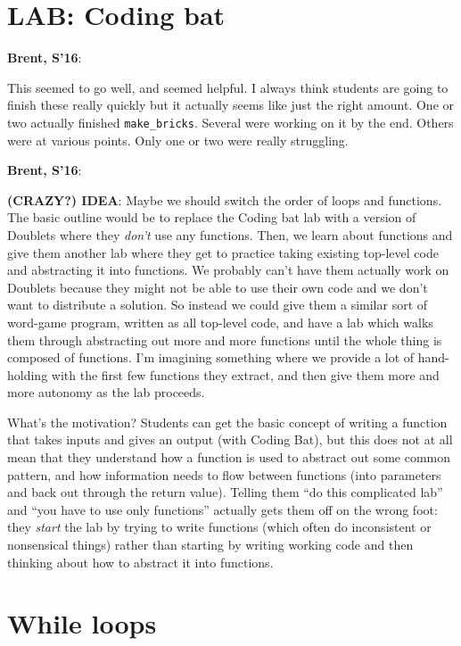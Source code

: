 \documentclass{article}
\newenvironment{reflect}[1]
{
  \noindent
  \begin{lrbox}{\reflectbox}
    \begin{minipage}[t]{\textwidth}
      \textbf{#1}:
}{
    \end{minipage}
  \end{lrbox}
  \fbox{\usebox{\reflectbox}}
}
\begin{document}
\section*{LAB: Coding bat}

\begin{reflect}{Brent, S'16}
  This seemed to go well, and seemed helpful.  I always think students
  are going to finish these really quickly but it actually seems like
  just the right amount.  One or two actually finished
  \verb|make_bricks|.  Several were working on it by the end.  Others
  were at various points.  Only one or two were really struggling.
\end{reflect}

\noindent
\begin{reflect}{Brent, S'16}
  \textbf{(CRAZY?) IDEA}: Maybe we should switch the order of loops
  and functions.  The basic outline would be to replace the Coding bat
  lab with a version of Doublets where they \emph{don't} use any
  functions.  Then, we learn about functions and give them another lab
  where they get to practice taking existing top-level code and
  abstracting it into functions.  We probably can't have them actually
  work on Doublets because they might not be able to use their own
  code and we don't want to distribute a solution.  So instead we
  could give them a similar sort of word-game program, written as all
  top-level code, and have a lab which walks them through abstracting
  out more and more functions until the whole thing is composed of
  functions.  I'm imagining something where we provide a lot of
  hand-holding with the first few functions they extract, and then
  give them more and more autonomy as the lab proceeds.

  What's the motivation? Students can get the basic concept of writing
  a function that takes inputs and gives an output (with Coding Bat),
  but this does not at all mean that they understand how a function is
  used to abstract out some common pattern, and how information needs
  to flow between functions (into parameters and back out through the
  return value).  Telling them ``do this complicated lab'' and ``you
  have to use only functions'' actually gets them off on the wrong
  foot: they \emph{start} the lab by trying to write functions (which
  often do inconsistent or nonsensical things) rather than starting by
  writing working code and then thinking about how to abstract it into
  functions.
\end{reflect}

\newpage
\section{While loops}
\end{document}
